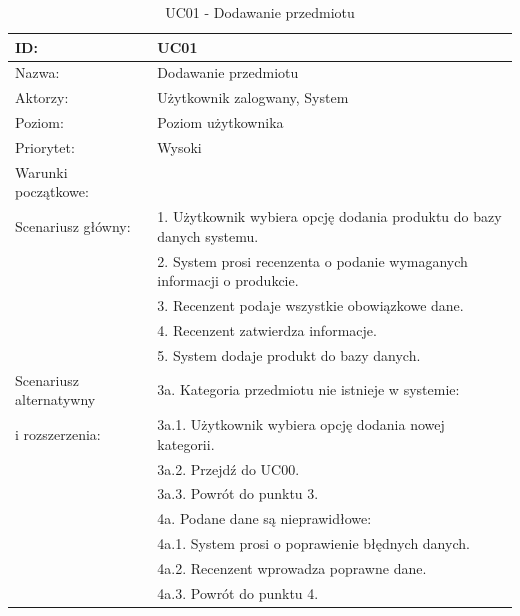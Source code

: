 \begin{table}[H]
    \begin{tabular}{|p{5cm}|p{9cm}|}\hline
    ID: & UC01 \\ \hline
    Nazwa: & Dodawanie przedmiotu \\\hline
    Aktorzy: & Użytkownik zalogwany, System \\\hline
    Poziom: & Poziom użytkownika  \\\hline
    Priorytet: & Wysoki \\\hline
    Warunki początkowe: & ~ \\\hline
    Scenariusz główny: & 1. Użytkownik wybiera opcję dodania produktu do bazy danych systemu. \\
    ~ & 2. System prosi recenzenta o podanie wymaganych informacji o produkcie. \\
    ~ & 3. Recenzent podaje wszystkie obowiązkowe dane. \\
    ~ & 4. Recenzent zatwierdza informacje. \\
    ~ & 5. System dodaje produkt do bazy danych. \\\hline
    Scenariusz alternatywny & 3a. Kategoria przedmiotu nie istnieje w systemie: \\
    i rozszerzenia: & 3a.1. Użytkownik wybiera opcję dodania nowej kategorii. \\
    ~ & 3a.2. Przejdź do UC00. \\
    ~ & 3a.3. Powrót do punktu 3. \\
    ~ & 4a. Podane dane są nieprawidłowe: \\
    ~ & 4a.1. System prosi o poprawienie błędnych danych. \\
    ~ & 4a.2. Recenzent wprowadza poprawne dane. \\
    ~ & 4a.3. Powrót do punktu 4. \\
    \hline\end{tabular}
	\caption{UC01 - Dodawanie przedmiotu}
\end{table}


